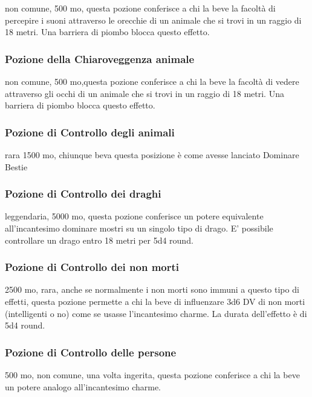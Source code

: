 \begin{multicols}{2}
non comune, 500 mo, questa pozione conferisce a chi la beve la facoltà di percepire i suoni attraverso le orecchie di un animale che si trovi in un raggio di 18 metri. Una barriera di piombo blocca questo effetto.

\subsubsection*{Pozione della Chiaroveggenza animale}
non comune, 500 mo,questa pozione conferisce a chi la beve la facoltà di vedere attraverso gli occhi di un animale che si trovi in un raggio di 18 metri. Una barriera di piombo blocca questo effetto.

\subsubsection*{Pozione di Controllo degli animali}
rara 1500 mo, chiunque beva questa posizione è come avesse lanciato Dominare Bestie


\subsubsection*{Pozione di Controllo dei draghi}
leggendaria, 5000 mo, questa pozione conferisce un potere equivalente all’incantesimo dominare mostri su un singolo tipo di drago. E' possibile controllare un drago entro 18 metri per 5d4 round.

\subsubsection*{Pozione di Controllo dei non morti}
2500 mo, rara, anche se normalmente i non morti sono immuni a questo tipo di effetti, questa pozione permette a chi la beve di influenzare 3d6 DV di non morti (intelligenti o no) come se usasse l'incantesimo charme. La durata dell’effetto è di 5d4 round.

\subsubsection*{Pozione di Controllo delle persone}
500 mo, non comune, una volta ingerita, questa pozione conferisce a chi la beve un potere analogo all'incantesimo charme.


\end{multicols}
